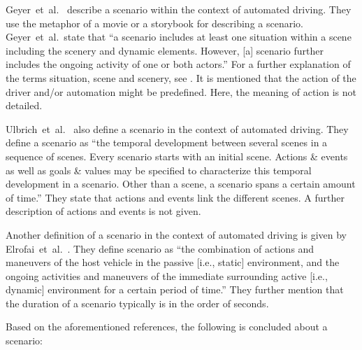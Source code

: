 Geyer~et~al.~\cite{geyer2014} describe a scenario within the context of automated driving. They use the metaphor of a movie or a storybook for describing a scenario. Geyer~et~al.\ state that ``a scenario includes at least one situation within a scene including the scenery and dynamic elements. However, [a] scenario further includes the ongoing activity of one or both actors.'' For a further explanation of the terms situation, scene and scenery, see \cite{geyer2014}. It is mentioned that the action of the driver and/or automation might be predefined. Here, the meaning of action is not detailed.

Ulbrich~et~al.~\cite{ulbrich2015} also define a scenario in the context of automated driving. They define a scenario as ``the temporal development between several scenes in a sequence of scenes. Every scenario starts with an initial scene. Actions \& events as well as goals \& values may be specified to characterize this temporal development in a scenario. Other than a scene, a scenario spans a certain amount of time.'' They state that actions and events link the different scenes. A further description of actions and events is not given.

Another definition of a scenario in the context of automated driving is given by Elrofai~et~al.~\cite{elrofai2016scenario}. They define scenario as ``the combination of actions and maneuvers of the host vehicle in the passive [i.e., static] environment, and the ongoing activities and maneuvers of the immediate surrounding active [i.e., dynamic] environment for a certain period of time.'' They further mention that the duration of a scenario typically is in the order of seconds.

Based on the aforementioned references, the following is concluded about a scenario:

